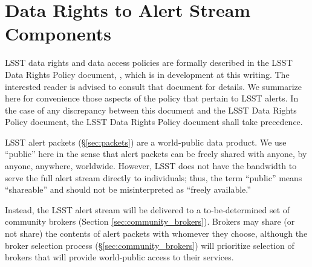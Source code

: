 \section{Data Rights to Alert Stream Components}\label{sec:data_rights}

LSST data rights and data access policies are formally described in the LSST Data Rights Policy document, , which is in development at this writing.
The interested reader is advised to consult that document for details.
We summarize here for convenience those aspects of the policy that pertain to LSST alerts.
In the case of any discrepancy between this document and the LSST Data Rights Policy document, the LSST Data Rights Policy document shall take precedence.

LSST alert packets (\S \ref{sec:packets}) are a world-public data product.
We use ``public'' here in the sense that alert packets can be freely shared with anyone, by anyone, anywhere, worldwide.
However, LSST does not have the bandwidth to serve the full alert stream directly to individuals; thus, the term ``public'' means ``shareable'' and should not be misinterpreted as ``freely available.''

Instead, the LSST alert stream will be delivered to a to-be-determined set of community brokers (Section \ref{sec:community_brokers}).
Brokers may share (or not share) the contents of alert packets with whomever they choose, although the broker selection process (\S \ref{sec:community_brokers}) will prioritize selection of brokers that will provide world-public access to their services.

